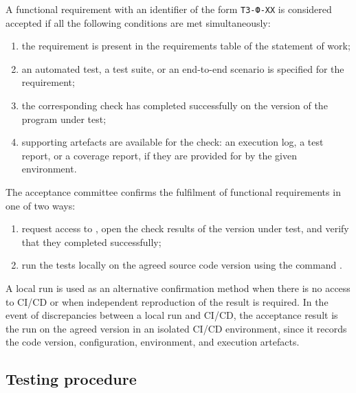 \documentclass[12pt,a4paper]{extarticle}
\begin{document}
\begin{hseExample}
A functional requirement with an identifier of the form \texttt{ТЗ-Ф-XX} is considered accepted if all the following conditions are met simultaneously:

\begin{enumerate}[label=\arabic*), leftmargin=1.25cm]
    \item the requirement is present in the requirements table of the statement of work;
    \item an automated test, a test suite, or an end-to-end scenario is specified for the requirement;
    \item the corresponding check has completed successfully on the version of the program under test;
    \item supporting artefacts are available for the check: an execution log, a test report, or a coverage report, if they are provided for by the given environment.
\end{enumerate}

The acceptance committee confirms the fulfilment of functional requirements in one of two ways:

\begin{enumerate}[label=\arabic*), leftmargin=1.25cm]
    \item request access to , open the check results of the version under test, and verify that they completed successfully;
    \item run the tests locally on the agreed source code version using the command .
\end{enumerate}

A local run is used as an alternative confirmation method when there is no access to CI/CD or when independent reproduction of the result is required. In the event of discrepancies between a local run and CI/CD, the acceptance result is the run on the agreed version in an isolated CI/CD environment, since it records the code version, configuration, environment, and execution artefacts.
\end{hseExample}

\subsection{Testing procedure}
\end{document}
